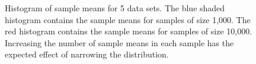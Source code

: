 \documentclass[singlepage,notitlepage,nofootinbib,11pt]{revtex4-1}
\begin{document}
\begin{figure}[h]
  \caption{\label{histos} Histogram of sample means for 5 data sets. The blue shaded histogram contains the sample means for samples of size 1,000. The red histogram contains the sample means for samples of size 10,000. Increasing the number of sample means in each sample has the expected effect of narrowing the distribution.}
\end{figure}
\clearpage
\end{document}
